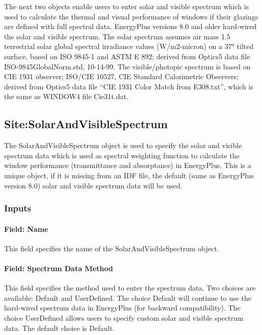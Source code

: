 The next two objects enable users to enter solar and visible spectrum which is used to calculate the thermal and visual performance of windows if their glazings are defined with full spectral data. EnergyPlus versions 8.0 and older hard-wired the solar and visible spectrum. The solar spectrum assumes air mass 1.5 terrestrial solar global spectral irradiance values (W/m2-micron) on a \ang{37} tilted surface, based on ISO 9845-1 and ASTM E 892; derived from Optics5 data file ISO-9845GlobalNorm.std, 10-14-99. The visible/photopic spectrum is based on CIE 1931 observer; ISO/CIE 10527, CIE Standard Calorimetric Observers; derived from Optics5 data file ``CIE 1931 Color Match from E308.txt'', which is the same as WINDOW4 file Cie31t.dat.

\subsection{Site:SolarAndVisibleSpectrum}\label{sitesolarandvisiblespectrum}

The SolarAndVisibleSpectrum object is used to specify the solar and visible spectrum data which is used as spectral weighting function to calculate the window performance (transmittance and absorptance) in EnergyPlus. This is a unique object, if it is missing from an IDF file, the default (same as EnergyPlus version 8.0) solar and visible spectrum data will be used.

\subsubsection{Inputs}\label{inputs-24-001}

\paragraph{Field: Name}\label{field-name-10-008}

This field specifies the name of the SolarAndVisibleSpectrum object.

\paragraph{Field: Spectrum Data Method}\label{field-spectrum-data-method}

This field specifies the method used to enter the spectrum data. Two choices are available: Default and UserDefined. The choice Default will continue to use the hard-wired spectrum data in EnergyPlus (for backward compatibility). The choice UserDefined allows users to specify custom solar and visible spectrum data. The default choice is Default.

